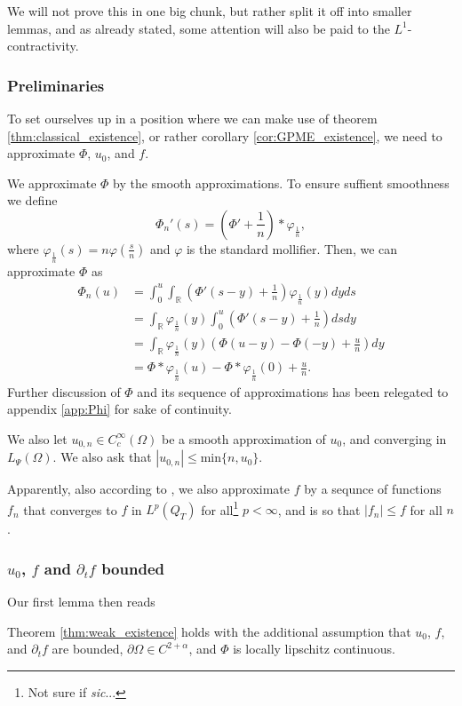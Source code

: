 \documentclass[11pt, a4paper]{article}
\begin{document}
We will not prove this in one big chunk, but rather split it off into smaller lemmas, and as already stated, some attention will also be paid to the $L^1$-contractivity.
\subsubsection{Preliminaries}
To set ourselves up in a position where we can make use of theorem \ref{thm:classical_existence}, or rather corollary \ref{cor:GPME_existence}, we need to approximate $\Phi$, $u_0$, and $f$.

We approximate $\Phi$ by the smooth approximations. To ensure suffient smoothness we define
\begin{equation*}
\Phi_n'(s) = \left( \Phi' + \frac{1}{n}\right)*\varphi_{\frac{1}{n}},
\end{equation*}
where $\varphi_{\frac{1}{n}}(s) = n\varphi\left( \frac{s}{n} \right)$ and $\varphi$ is the standard mollifier. Then, we can approximate $\Phi$ as
\begin{align*}
\Phi_n(u) &= \int_0^u \int_\mathbb{R}\left( \Phi'(s-y) + \frac{1}{n}\right)\varphi_{\frac{1}{n}}(y)dyds \\
&= \int_\mathbb{R}\varphi_{\frac{1}{n}}(y) \int_0^u \left( \Phi'(s-y) + \frac{1}{n}\right)dsdy \\
&= \int_\mathbb{R}\varphi_{\frac{1}{n}}(y) \left( \Phi(u-y) - \Phi(-y) + \frac{u}{n}\right)dy \\
&= \Phi * \varphi_{\frac{1}{n}}(u) - \Phi * \varphi_{\frac{1}{n}}(0) + \frac{u}{n}.
\end{align*}
Further discussion of $\Phi$ and its sequence of approximations has been relegated to appendix \ref{app:Phi} for sake of continuity.




We also let $u_{0,n}\in C^\infty_c(\Omega)$ be a smooth approximation of $u_0$, and converging in $L_\Psi(\Omega)$. We also ask that $|u_{0,n}| \leq $min$\{n,u_0\}$.

Apparently, also according to \citep{vazquez2007porous}, we also approximate $f$ by a sequnce of functions $f_n$ that converges to $f$ in $L^p(Q_T)$ for all\footnote{Not sure if \textit{sic}...} $p<\infty$, and is so that $|f_n| \leq f$ for all $n$.

\subsubsection{$u_0$, $f$ and $\partial_t f$ bounded}
Our first lemma then reads
\begin{lemma}
Theorem \ref{thm:weak_existence} holds with the additional assumption that $u_0$, $f$, and $\partial_t f$ are bounded, $\partial \Omega \in C^{2+\alpha}$, and $\Phi$ is locally lipschitz continuous.
\end{lemma}
\end{document}
